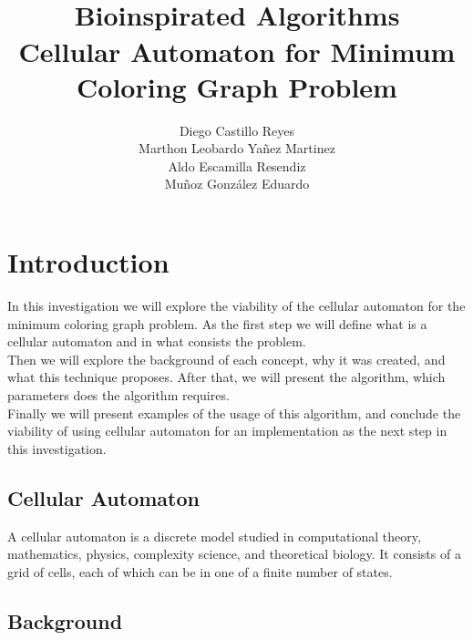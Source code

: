 \documentclass{article}
\title{\Huge{\textbf{}}\\
\Large{\textbf{Bioinspirated Algorithms\\ Cellular Automaton for Minimum Coloring Graph Problem}}}
\author{Diego Castillo Reyes\\Marthon Leobardo Yañez Martinez\\Aldo Escamilla Resendiz\\Muñoz González Eduardo}
\begin{document}
    \maketitle
    \newpage
    \tableofcontents
    \newpage
    \section{Introduction}
        In this investigation we will explore the viability of the cellular automaton for the minimum coloring graph problem.
        As the first step we will define what is a cellular automaton and in what consists the problem.\\ 
        Then we will explore the background of each concept, why it was created, and what this technique proposes. After that, 
        we will present the algorithm, which parameters does the algorithm requires. 
        \\Finally we will present examples of the usage of this
        algorithm, and conclude the viability of using cellular automaton for an implementation as the next step in this investigation.
    \newpage

    \begin{multicols}{2}
        \section{Cellular Automaton}
        A cellular automaton is a discrete model studied in computational theory, mathematics,
        physics, complexity science, and theoretical biology. It consists of a grid of cells,
        each of which can be in one of a finite number of states.
        \subsection{Background}


    \end{multicols}
\end{document}
